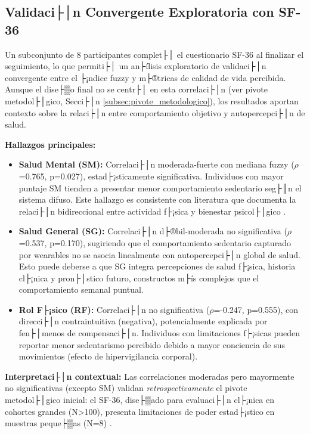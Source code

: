 \subsection{Validaci├│n Convergente Exploratoria con SF-36}
\label{subsec:sf36_exploratorio}

Un subconjunto de 8 participantes complet├│ el cuestionario SF-36 al finalizar el seguimiento, lo que permiti├│ un an├ílisis exploratorio de validaci├│n convergente entre el ├¡ndice fuzzy y m├®tricas de calidad de vida percibida. Aunque el dise├▒o final no se centr├│ en esta correlaci├│n (ver pivote metodol├│gico, Secci├│n \ref{subsec:pivote_metodologico}), los resultados aportan contexto sobre la relaci├│n entre comportamiento objetivo y autopercepci├│n de salud.

\textbf{Hallazgos principales:}
\begin{itemize}
    \item \textbf{Salud Mental (SM):} Correlaci├│n moderada-fuerte con mediana fuzzy ($\rho$=0.765, p=0.027), estad├¡sticamente significativa. Individuos con mayor puntaje SM tienden a presentar menor comportamiento sedentario seg├║n el sistema difuso. Este hallazgo es consistente con literatura que documenta la relaci├│n bidireccional entre actividad f├¡sica y bienestar psicol├│gico \cite{Schuch2018}.
    
    \item \textbf{Salud General (SG):} Correlaci├│n d├®bil-moderada no significativa ($\rho$=0.537, p=0.170), sugiriendo que el comportamiento sedentario capturado por wearables no se asocia linealmente con autopercepci├│n global de salud. Esto puede deberse a que SG integra percepciones de salud f├¡sica, historia cl├¡nica y pron├│stico futuro, constructos m├ís complejos que el comportamiento semanal puntual.
    
    \item \textbf{Rol F├¡sico (RF):} Correlaci├│n no significativa ($\rho$=-0.247, p=0.555), con direcci├│n contraintuitiva (negativa), potencialmente explicada por fen├│menos de compensaci├│n. Individuos con limitaciones f├¡sicas pueden reportar menor sedentarismo percibido debido a mayor conciencia de sus movimientos (efecto de hipervigilancia corporal).
\end{itemize}

\textbf{Interpretaci├│n contextual:} Las correlaciones moderadas pero mayormente no significativas (excepto SM) validan \textit{retrospectivamente} el pivote metodol├│gico inicial: el SF-36, dise├▒ado para evaluaci├│n cl├¡nica en cohortes grandes (N>100), presenta limitaciones de poder estad├¡stico en muestras peque├▒as (N=8) \cite{Healy2024}.

